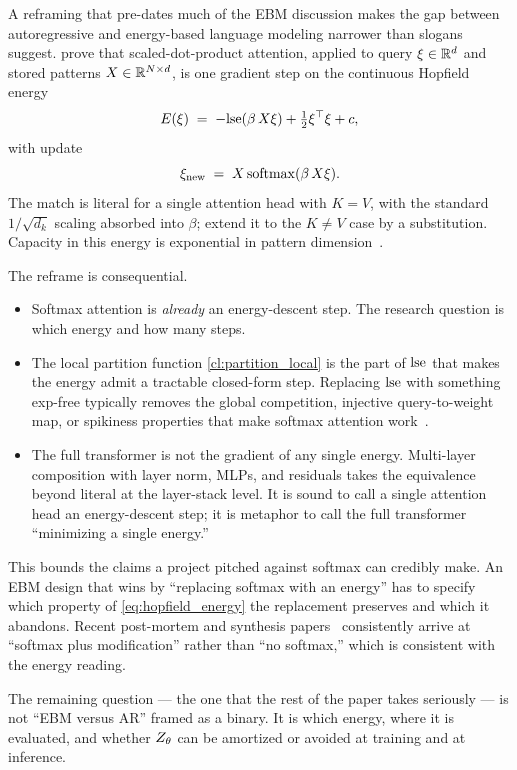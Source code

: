 A reframing that pre-dates much of the EBM discussion makes the gap between autoregressive and energy-based language modeling narrower than slogans suggest.
\citet{ramsauer2020hopfield} prove that scaled-dot-product attention, applied to query $\xi \in \mathbb{R}^d$ and stored patterns $X \in \mathbb{R}^{N \times d}$, is one gradient step on the continuous Hopfield energy
\begin{equation}
  E(\xi) \;=\; -\mathrm{lse}(\beta\, X\xi) + \tfrac{1}{2}\xi^\top \xi + c,
  \label{eq:hopfield_energy}
\end{equation}
with update
\begin{equation}
  \xi_{\mathrm{new}} \;=\; X \,\mathrm{softmax}(\beta\, X\xi).
  \label{eq:hopfield_update}
\end{equation}
The match is literal for a single attention head with $K = V$, with the standard $1/\sqrt{d_k}$ scaling absorbed into $\beta$;
\citet{ramsauer2020hopfield} extend it to the $K \neq V$ case by a substitution.
Capacity in this energy is exponential in pattern dimension~\citep{demircigil2017model}.

The reframe is consequential.
\begin{itemize}
  \item Softmax attention is \emph{already} an energy-descent step.
        The research question is which energy and how many steps.
  \item The local partition function \ref{cl:partition_local} is the part of $\mathrm{lse}$ that makes the energy admit a tractable closed-form step.
        Replacing $\mathrm{lse}$ with something exp-free typically removes the global competition, injective query-to-weight map, or spikiness properties that make softmax attention work~\citep{zhang2024hedgehog,han2024bridging}.
  \item The full transformer is not the gradient of any single energy.
        Multi-layer composition with layer norm, MLPs, and residuals takes the equivalence beyond literal at the layer-stack level.
        It is sound to call a single attention head an energy-descent step;
        it is metaphor to call the full transformer ``minimizing a single energy.''
\end{itemize}
This bounds the claims a project pitched against softmax can credibly make.
An EBM design that wins by ``replacing softmax with an energy'' has to specify which property of \cref{eq:hopfield_energy} the replacement preserves and which it abandons.
Recent post-mortem and synthesis papers~\citep{jelassi2024repeat,zhang2024hedgehog,han2024bridging,mongaras2025expressiveness} consistently arrive at ``softmax plus modification'' rather than ``no softmax,'' which is consistent with the energy reading.

The remaining question --- the one that the rest of the paper takes seriously --- is not ``EBM versus AR'' framed as a binary.
It is which energy, where it is evaluated, and whether $Z_\theta$ can be amortized or avoided at training and at inference.
